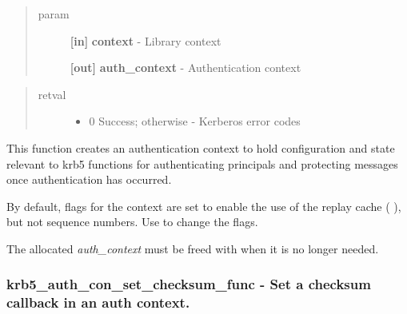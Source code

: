 \documentclass[letterpaper,10pt,english]{sphinxmanual}
\begin{document}
\begin{quote}\begin{description}
\item[{param}] \leavevmode
\textbf{{[}in{]}} \textbf{context} - Library context

\textbf{{[}out{]}} \textbf{auth\_context} - Authentication context

\end{description}\end{quote}
\begin{quote}\begin{description}
\item[{retval}] \leavevmode\begin{itemize}
\item {} 
0   Success; otherwise - Kerberos error codes

\end{itemize}

\end{description}\end{quote}

This function creates an authentication context to hold configuration and state relevant to krb5 functions for authenticating principals and protecting messages once authentication has occurred.

By default, flags for the context are set to enable the use of the replay cache ( {\hyperref[appdev/refs/macros/KRB5_AUTH_CONTEXT_DO_TIME:KRB5_AUTH_CONTEXT_DO_TIME]{}} ), but not sequence numbers. Use {\hyperref[appdev/refs/api/krb5_auth_con_setflags:krb5_auth_con_setflags]{}} to change the flags.

The allocated \emph{auth\_context} must be freed with {\hyperref[appdev/refs/api/krb5_auth_con_free:krb5_auth_con_free]{}} when it is no longer needed.


\subsubsection{krb5\_auth\_con\_set\_checksum\_func -  Set a checksum callback in an auth context.}
\label{appdev/refs/api/krb5_auth_con_set_checksum_func:krb5-auth-con-set-checksum-func-set-a-checksum-callback-in-an-auth-context}\label{appdev/refs/api/krb5_auth_con_set_checksum_func::doc}

\begin{fulllineitems}
\label{appdev/refs/api/krb5_auth_con_set_checksum_func:krb5_auth_con_set_checksum_func}
\end{fulllineitems}
\end{document}
